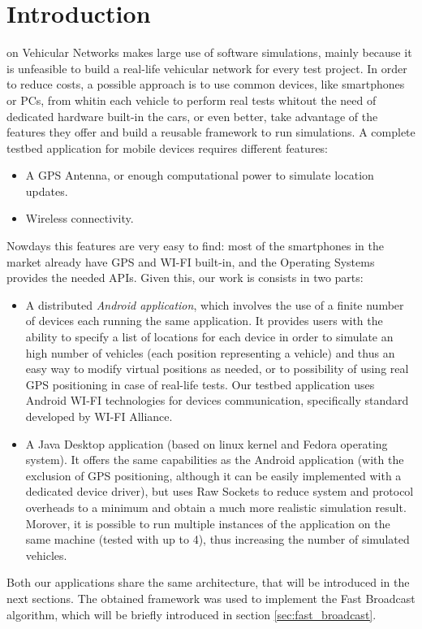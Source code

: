 \section{Introduction}
% 
% 
% 
% 
 on Vehicular Networks makes large use of software simulations, mainly because it is unfeasible to build a real-life vehicular network for every test project.
In order to reduce costs, a possible approach is to use common devices, like smartphones or PCs, from whitin each vehicle to perform real tests whitout the need of dedicated hardware built-in the cars, or even better, take advantage of the features they offer and build a reusable framework to run simulations.
A complete testbed application for mobile devices requires different features:
\begin{itemize}
	\item A GPS Antenna, or enough computational power to simulate location updates.
	\item Wireless connectivity.
\end{itemize}

Nowdays this features are very easy to find: most of the smartphones in the market already have GPS and WI-FI built-in, and the Operating Systems provides the needed APIs.
Given this, our work is consists in two parts:
\begin{itemize}
	\item A distributed \textit{Android application}, which involves the use of a finite number of devices each running the same application. It provides users with the ability to specify a list of locations for each device in order to simulate an high number of vehicles (each position representing a vehicle) and thus an easy way to modify virtual positions as needed, or to possibility of using real GPS positioning in case of real-life tests. Our testbed application uses Android WI-FI technologies for devices communication, specifically \direct standard developed by WI-FI Alliance\textsuperscript{\texttrademark}.
	\item A Java Desktop application (based on linux kernel and Fedora operating system). It offers the same capabilities as the Android application (with the exclusion of GPS positioning, although it can be easily implemented with a dedicated device driver), but uses Raw Sockets to reduce system and protocol overheads to a minimum and obtain a much more realistic simulation result. Morover, it is possible to run multiple instances of the application on the same machine (tested with up to 4), thus increasing the number of simulated vehicles.
\end{itemize}

Both our applications share the same architecture, that will be introduced in the next sections. The obtained framework was used to implement the Fast Broadcast algorithm, which will be briefly introduced in section \ref{sec:fast_broadcast}.

